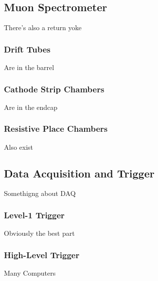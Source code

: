 \subsection{Muon Spectrometer}
There's also a return yoke

\subsubsection{Drift Tubes}
Are in the barrel

\subsubsection{Cathode Strip Chambers}
Are in the endcap

\subsubsection{Resistive Place Chambers}
Also exist


\subsection{Data Acquisition and Trigger}
Somethigng about DAQ

\subsubsection{Level-1 Trigger}
Obviously the best part

\subsubsection{High-Level Trigger}
Many Computers
